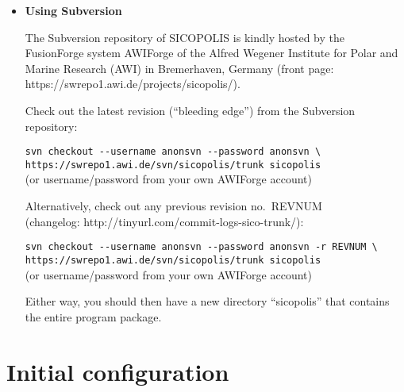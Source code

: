 \documentclass[12pt,a4paper]{article}
\begin{document}
\begin{itemize}

\item \textbf{Using Subversion}

The Subversion repository of SICOPOLIS is kindly hosted by the FusionForge system AWIForge of the Alfred Wegener Institute for Polar and Marine Research (AWI) in Bremerhaven, Germany (front page: https://swrepo1.awi.de/projects/sicopolis/).

Check out the latest revision (``bleeding edge'') from the Subversion repository:

\begin{small}
\hspace*{3.33mm}\verb+svn checkout --username anonsvn --password anonsvn \+
\\[-1ex]
\hspace*{6.67mm}\verb+https://swrepo1.awi.de/svn/sicopolis/trunk sicopolis+
\\
\hspace*{3.33mm}(or username/password from your own AWIForge account)
\end{small}

Alternatively, check out any previous revision no.\ REVNUM\\
(changelog: http://tinyurl.com/commit-logs-sico-trunk/):

\begin{small}
\hspace*{3.33mm}\verb+svn checkout --username anonsvn --password anonsvn -r REVNUM \+
\\[-1ex]
\hspace*{6.67mm}\verb+https://swrepo1.awi.de/svn/sicopolis/trunk sicopolis+
\\
\hspace*{3.33mm}(or username/password from your own AWIForge account)
\end{small}

Either way, you should then have a new directory ``sicopolis'' that contains the entire program package.

\end{itemize}

\clearpage


\section{Initial configuration}
\end{document}
